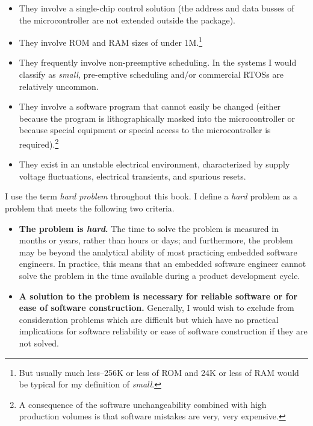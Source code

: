 \begin{itemize}
\item They
involve a single-chip control solution (the address and data busses of
the microcontroller are not extended outside the package).
\item They
involve ROM and RAM sizes of under 1M.\footnote{But usually much less--256K or less of ROM and 24K
or less of RAM would be typical for my definition of \emph{small}.}
\item They frequently involve non-preemptive scheduling.  In the systems I would
classify as \emph{small}, pre-emptive scheduling and/or commercial
RTOSs are relatively uncommon.
\item They involve a software
program that cannot easily be changed (either because the program
is lithographically masked into the microcontroller or because special
equipment or special access to the microcontroller is required).\footnote{A consequence of the
software unchangeability
combined with high production volumes is
that software mistakes are very, very expensive.}
\item They exist in an unstable electrical environment,
characterized by supply voltage fluctuations,
electrical transients, and spurious resets.
\end{itemize}

I use the term \emph{hard problem} throughout this book.
I define a
\emph{hard} problem as a problem that
meets the following two criteria.
\begin{itemize}
   \item \textbf{The problem is \emph{hard}.}
         The time to solve the problem is measured in
         months or years, rather than hours or days; and furthermore,
         the problem may be beyond the analytical ability of
         most practicing embedded software engineers.  In practice, this means that
         an embedded software engineer cannot solve the problem in the time
         available during a product development cycle.
   \item \textbf{A solution to the problem is necessary for
         reliable software or for ease of software construction.}
         Generally, I would wish to exclude from consideration
         problems which are difficult but which have no practical implications
         for software reliability or ease of software construction
         if they are not solved.
\end{itemize}

